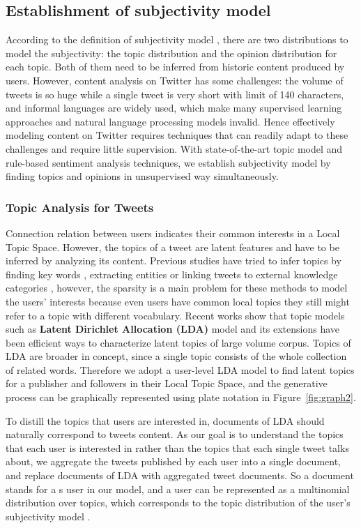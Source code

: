 \documentclass[smallcondensed]{svjour3}     %
\begin{document}
\subsection{Establishment of subjectivity model }
\label{concrete}
According to the definition of subjectivity model , there are two distributions to model the subjectivity: the topic distribution and the opinion distribution for each topic. Both of them need to be inferred from historic content produced by users.
However, content analysis on Twitter has some challenges: the volume of tweets is so huge while a single tweet is very short with limit of 140 characters, and informal languages are widely used, which make many supervised learning approaches and natural language processing models invalid. 
Hence effectively modeling content on Twitter requires techniques that can readily adapt to these challenges and require little supervision.
With state-of-the-art topic model and rule-based sentiment analysis techniques, we establish subjectivity model  by finding topics and opinions in unsupervised way simultaneously. 
\subsubsection{Topic Analysis for Tweets}
\label{local}
Connection relation between users indicates their common interests in a Local Topic Space. 
However, the topics of a tweet are latent features and have to be inferred by analyzing its content.
Previous studies have tried to infer topics by finding key words \cite{Chen:2010STE}, extracting  entities \cite{Abel:2011AUM} or linking tweets to external knowledge categories \cite{conf/icwsm/MacskassyM11}, however, the sparsity is a main problem for these methods to model the users' interests because even users have common local topics they still might refer to a topic with different vocabulary.
Recent works show that topic models such as \textbf{Latent Dirichlet Allocation (LDA)} model and its extensions\cite{blei2003latent,conf/wsdm/WengLJH10} have been efficient ways to characterize latent topics of large volume corpus.  
Topics of LDA are broader in concept, since a single topic consists of the whole collection of related words. 
Therefore we adopt a user-level LDA model to find latent topics for a publisher and followers in their Local Topic Space, and the generative process can be graphically represented using plate notation in Figure~\ref{fig:graph2}.

To distill the topics that users are interested in, documents of LDA should naturally correspond to tweets content. 
As our goal is to understand the topics that each user is interested in rather than the topics that each single tweet talks about, we aggregate the tweets published by each user into a single document, and replace documents of LDA with aggregated tweet documents. 
So a document stands for a s user in our model, and a user can be represented as a multinomial distribution over topics, which corresponds to the topic distribution of the user's subjectivity model .
 
\end{document}
